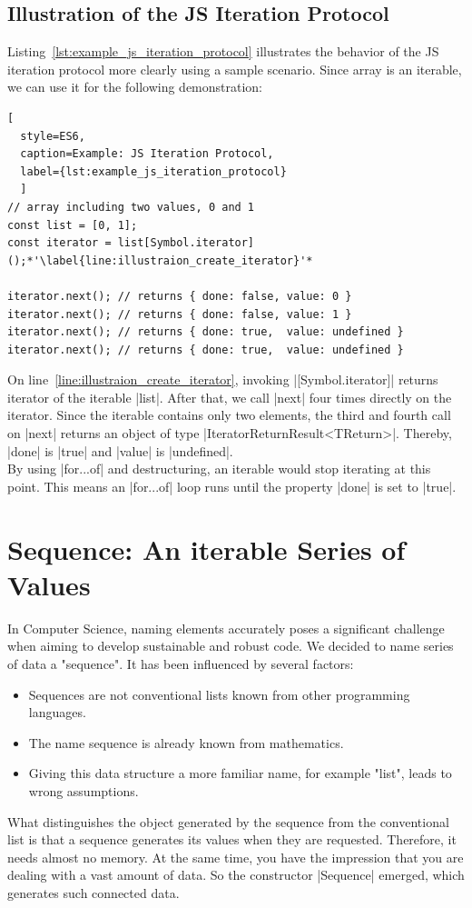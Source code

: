 \subsection{Illustration of the JS Iteration Protocol}
\label{sub:Illustration of the JS Iteration Protocol}
Listing~\ref{lst:example_js_iteration_protocol} illustrates the behavior of the
JS iteration protocol more clearly using a sample scenario. Since array is an
iterable, we can use it for the following demonstration:

\begin{lstlisting}[
  style=ES6, 
  caption=Example: JS Iteration Protocol,
  label={lst:example_js_iteration_protocol}
  ]
// array including two values, 0 and 1
const list = [0, 1];
const iterator = list[Symbol.iterator]();*'\label{line:illustraion_create_iterator}'*

iterator.next(); // returns { done: false, value: 0 }
iterator.next(); // returns { done: false, value: 1 }
iterator.next(); // returns { done: true,  value: undefined }
iterator.next(); // returns { done: true,  value: undefined }
\end{lstlisting}

On line~\ref{line:illustraion_create_iterator}, invoking |[Symbol.iterator]|
returns iterator of the iterable |list|. 
After that, we call |next| four times directly on the iterator. Since the
iterable contains only two elements, the third and fourth call on |next|
returns an object of type |IteratorReturnResult<TReturn>|. Thereby, |done| is
|true| and |value| is |undefined|. \\
By using |for...of| and destructuring, an iterable would stop iterating at this
point. This means an |for...of| loop runs until the property |done| is set to
|true|.

\section{Sequence: An iterable Series of Values}
\label{sec:Sequence: A Series of Values}
In Computer Science, naming elements accurately poses a significant challenge 
when aiming to develop sustainable and robust code. We decided to name series
of data a "sequence". It has been influenced by several factors:

\begin{itemize}
  \item Sequences are not conventional lists known from other programming
    languages.
\item The name sequence is already known from mathematics.
\item Giving this data structure a more familiar name, for example "list",
  leads to wrong assumptions. 
\end{itemize}
What distinguishes the object generated by the sequence from the conventional
list is that a sequence generates its values when they are requested.
Therefore, it needs almost no memory. At the same time, you have the impression
that you are dealing with a vast amount of data. So the constructor |Sequence|
emerged, which generates such connected data.


